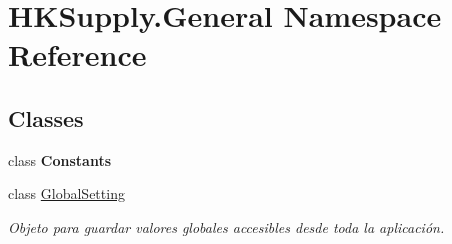 \hypertarget{namespace_h_k_supply_1_1_general}{}\section{H\+K\+Supply.\+General Namespace Reference}
\label{namespace_h_k_supply_1_1_general}
\subsection*{Classes}
\begin{DoxyCompactItemize}
\item 
class {\bfseries Constants}
\item 
class \mbox{\hyperlink{class_h_k_supply_1_1_general_1_1_global_setting}{Global\+Setting}}
\begin{DoxyCompactList}\small\item\em Objeto para guardar valores globales accesibles desde toda la aplicación. \end{DoxyCompactList}\end{DoxyCompactItemize}
